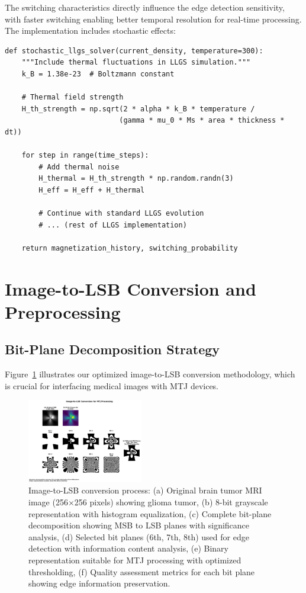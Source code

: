 \documentclass[conference]{IEEEtran}
\begin{document}
The switching characteristics directly influence the edge detection sensitivity, with faster switching enabling better temporal resolution for real-time processing. The implementation includes stochastic effects:

\begin{lstlisting}[caption={Stochastic LLGS implementation with thermal effects}]
def stochastic_llgs_solver(current_density, temperature=300):
    """Include thermal fluctuations in LLGS simulation."""
    k_B = 1.38e-23  # Boltzmann constant
    
    # Thermal field strength
    H_th_strength = np.sqrt(2 * alpha * k_B * temperature / 
                           (gamma * mu_0 * Ms * area * thickness * dt))
    
    for step in range(time_steps):
        # Add thermal noise
        H_thermal = H_th_strength * np.random.randn(3)
        H_eff = H_eff + H_thermal
        
        # Continue with standard LLGS evolution
        # ... (rest of LLGS implementation)
        
    return magnetization_history, switching_probability
\end{lstlisting}

\section{Image-to-LSB Conversion and Preprocessing}

\subsection{Bit-Plane Decomposition Strategy}

Figure~\ref{fig:image_to_lsb} illustrates our optimized image-to-LSB conversion methodology, which is crucial for interfacing medical images with MTJ devices.

\begin{figure}[htbp]
\centerline{\includegraphics[width=0.45\textwidth]{image_to_lsb_conversion.png}}
\caption{Image-to-LSB conversion process: (a) Original brain tumor MRI image (256$\times$256 pixels) showing glioma tumor, (b) 8-bit grayscale representation with histogram equalization, (c) Complete bit-plane decomposition showing MSB to LSB planes with significance analysis, (d) Selected bit planes (6th, 7th, 8th) used for edge detection with information content analysis, (e) Binary representation suitable for MTJ processing with optimized thresholding, (f) Quality assessment metrics for each bit plane showing edge information preservation.}
\label{fig:image_to_lsb}
\end{figure}
\end{document}
